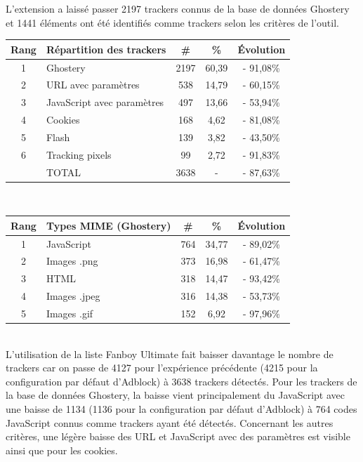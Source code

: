 L'extension a laissé passer 2197 trackers connus de la base de données Ghostery et 1441 éléments ont été identifiés comme trackers selon les critères de l'outil.\\

\begin{tabular}{ c | p{5cm} | c | c || c | }
   Rang & Répartition des trackers & \# & \% & Évolution \\
   \hline
   \hline
   1 & Ghostery & 2197 & 60,39 & - 91,08\% \\
   2 & URL avec paramètres & 538 & 14,79 & - 60,15\% \\
   3 & JavaScript avec paramètres & 497 & 13,66 & - 53,94\% \\
   4 & Cookies & 168 & 4,62 & - 81,08\% \\
   5 & Flash & 139 & 3,82 & - 43,50\% \\
   6 & Tracking pixels & 99 & 2,72 & - 91,83\% \\
   \hline
    & TOTAL & 3638 & - & - 87,63\%\\
   \hline
\end{tabular}
\\[1cm]

\begin{tabular}{ c | p{5cm} | c | c | c | }
   Rang & Types MIME (Ghostery) & \# & \% & Évolution\\
   \hline
   \hline
   1 & JavaScript & 764 & 34,77 & - 89,02\% \\
   2 & Images .png & 373 & 16,98 & - 61,47\% \\
   3 & HTML & 318 & 14,47 & - 93,42\% \\
   4 & Images .jpeg & 316 & 14,38 & - 53,73\% \\
   5 & Images .gif & 152 & 6,92 & - 97,96\% \\
   \hline
\end{tabular}
\\[.3cm]

L'utilisation de la liste Fanboy Ultimate fait baisser davantage le nombre de trackers car on passe de 4127 pour l'expérience précédente (4215 pour la configuration par défaut d'Adblock) à 3638 trackers détectés. Pour les trackers de la base de données Ghostery, la baisse vient principalement du JavaScript avec une baisse de 1134 (1136 pour la configuration par défaut d'Adblock) à 764 codes JavaScript connus comme trackers ayant été détectés. Concernant les autres critères, une légère baisse des URL et JavaScript avec des paramètres est visible ainsi que pour les cookies.


